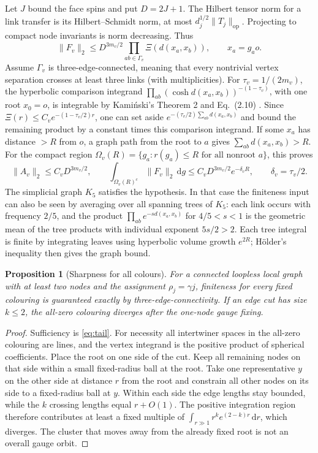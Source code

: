 \documentclass[11pt]{article}
\newtheorem{proposition}[theorem]{Proposition}
\theoremstyle{remark}
\newcommand{\dd}{\mathrm d}
\begin{document}
Let \(J\) bound the face spins and put \(D=2J+1\). The Hilbert tensor norm for a link transfer is its Hilbert--Schmidt norm, at most \(d_j^{1/2}\|T_j\|_{\mathrm{op}}\). Projecting to compact node invariants is norm decreasing. Thus
\begin{equation}\label{eq:Fn}
\|F_v\|_2\le D^{3m_v/2}\prod_{a b\in\Gamma_v}\Xi(d(x_a,x_b)),\qquad x_a=g_a o .
\end{equation}
Assume \(\Gamma_v\) is three-edge-connected, meaning that every nontrivial vertex separation crosses at least three links (with multiplicities). For \(\tau_v=1/(2m_v)\), the hyperbolic comparison integrand
\(\prod_{a b}(\cosh d(x_a,x_b))^{-(1-\tau_v)}\), with one root \(x_0=o\), is integrable by Kami\'nski's Theorem 2 and Eq.~(2.10) \cite{Kaminski}. Since \(\Xi(r)\le C_v e^{-(1-\tau_v/2)r}\), one can set aside \(e^{-(\tau_v/2)\sum_{a b}d(x_a,x_b)}\) and bound the remaining product by a constant times this comparison integrand. If some \(x_a\) has distance \(>R\) from \(o\), a graph path from the root to \(a\) gives \(\sum_{a b}d(x_a,x_b)>R\). For the compact region \(\Omega_v(R)=\{g_a:r(g_a)\le R\text{ for all nonroot }a\}\), this proves
\begin{equation}\label{eq:tail}
\|A_v\|_2\le C_vD^{3m_v/2},\qquad
\int_{\Omega_v(R)^c}\|F_v\|_2\,\dd g
\le C_vD^{3m_v/2}e^{-\delta_vR},\qquad \delta_v=\tau_v/2.
\end{equation}
The simplicial graph \(K_5\) satisfies the hypothesis. In that case the finiteness input can also be seen by averaging over all spanning trees of \(K_5\): each link occurs with frequency \(2/5\), and the product \(\prod_{ab} e^{-s d(x_a,x_b)}\) for \(4/5<s<1\) is the geometric mean of the tree products with individual exponent \(5s/2>2\). Each tree integral is finite by integrating leaves using hyperbolic volume growth \(e^{2R}\); H\"older's inequality then gives the graph bound.

\begin{proposition}[Sharpness for all colours]\label{pr:cut}
For a connected loopless local graph with at least two nodes and the assignment \(\rho_j=\gamma j\), finiteness for every fixed colouring is guaranteed exactly by three-edge-connectivity. If an edge cut has size \(k\le2\), the all-zero colouring diverges after the one-node gauge fixing.
\end{proposition}
\begin{proof}
Sufficiency is \eqref{eq:tail}. For necessity all intertwiner spaces in the all-zero colouring are lines, and the vertex integrand is the positive product of spherical coefficients. Place the root on one side of the cut. Keep all remaining nodes on that side within a small fixed-radius ball at the root. Take one representative \(y\) on the other side at distance \(r\) from the root and constrain all other nodes on its side to a fixed-radius ball at \(y\). Within each side the edge lengths stay bounded, while the \(k\) crossing lengths equal \(r+O(1)\). The positive integration region therefore contributes at least a fixed multiple of \(\int_{r\gg1}r^k e^{(2-k)r}\,\dd r\), which diverges. The cluster that moves away from the already fixed root is not an overall gauge orbit.
\end{proof}
\end{document}
